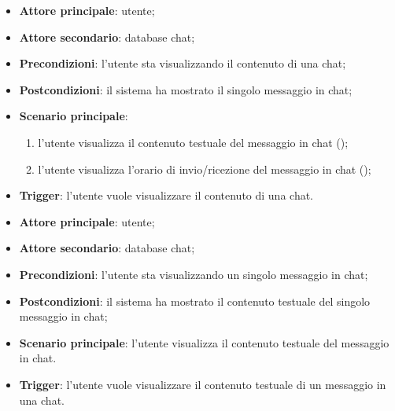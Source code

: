 \documentclass[10pt, a4paper]{article}
\begin{document}
    \begin{itemize}
        \item \textbf{Attore principale}: utente;
        \item \textbf{Attore secondario}: database chat;
        \item \textbf{Precondizioni}: l’utente sta visualizzando il contenuto di una chat;
        \item \textbf{Postcondizioni}: il sistema ha mostrato il singolo messaggio in chat;
        \item \textbf{Scenario principale}:
            \begin{enumerate}
                \item l’utente visualizza il contenuto testuale del messaggio in chat ();
                \item l’utente visualizza l'orario di invio/ricezione del messaggio in chat ();
            \end{enumerate}
        \item \textbf{Trigger}: l’utente vuole visualizzare il contenuto di una chat.
    \end{itemize}

    \begin{itemize}
        \item \textbf{Attore principale}: utente;
        \item \textbf{Attore secondario}: database chat;
        \item \textbf{Precondizioni}: l’utente sta visualizzando un singolo messaggio in chat;
        \item \textbf{Postcondizioni}: il sistema ha mostrato il contenuto testuale del singolo messaggio in chat;
        \item \textbf{Scenario principale}: l’utente visualizza il contenuto testuale del messaggio in chat.
        \item \textbf{Trigger}: l’utente vuole visualizzare il contenuto testuale di un messaggio in una chat.
    \end{itemize}
\end{document}
